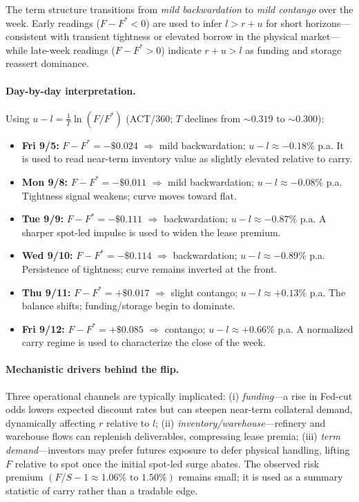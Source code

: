 \documentclass[10pt,a4paper]{article} %
\begin{document}
The term structure transitions from \emph{mild backwardation} to \emph{mild contango} over the week. Early readings (\(F-F^{*}<0\)) are used to infer \(l>r+u\) for short horizons—consistent with transient tightness or elevated borrow in the physical market—while late-week readings (\(F-F^{*}>0\)) indicate \(r+u>l\) as funding and storage reassert dominance.

\paragraph{Day-by-day interpretation.}
Using \(u-l=\frac{1}{T}\ln(F/F^{*})\) (ACT/360; \(T\) declines from \(\sim 0.319\) to \(\sim 0.300\)):
\begin{itemize}
  \item \textbf{Fri 9/5:} \(F-F^{*}=-\$0.024\) \(\Rightarrow\) mild backwardation; \(u-l\approx-0.18\%\) p.a. It is used to read near-term inventory value as slightly elevated relative to carry.
  \item \textbf{Mon 9/8:} \(F-F^{*}=-\$0.011\) \(\Rightarrow\) mild backwardation; \(u-l\approx-0.08\%\) p.a. Tightness signal weakens; curve moves toward flat.
  \item \textbf{Tue 9/9:} \(F-F^{*}=-\$0.111\) \(\Rightarrow\) backwardation; \(u-l\approx-0.87\%\) p.a. A sharper spot-led impulse is used to widen the lease premium.
  \item \textbf{Wed 9/10:} \(F-F^{*}=-\$0.114\) \(\Rightarrow\) backwardation; \(u-l\approx-0.89\%\) p.a. Persistence of tightness; curve remains inverted at the front.
  \item \textbf{Thu 9/11:} \(F-F^{*}=+\$0.017\) \(\Rightarrow\) slight contango; \(u-l\approx+0.13\%\) p.a. The balance shifts; funding/storage begin to dominate.
  \item \textbf{Fri 9/12:} \(F-F^{*}=+\$0.085\) \(\Rightarrow\) contango; \(u-l\approx+0.66\%\) p.a. A normalized carry regime is used to characterize the close of the week.
\end{itemize}

\paragraph{Mechanistic drivers behind the flip.}
Three operational channels are typically implicated: (i) \emph{funding}—a rise in Fed-cut odds lowers expected discount rates but can steepen near-term collateral demand, dynamically affecting \(r\) relative to \(l\); (ii) \emph{inventory/warehouse}—refinery and warehouse flows can replenish deliverables, compressing lease premia; (iii) \emph{term demand}—investors may prefer futures exposure to defer physical handling, lifting \(F\) relative to spot once the initial spot-led surge abates. The observed risk premium \((F/S-1\approx 1.06\% \text{ to } 1.50\%)\) remains small; it is used as a summary statistic of carry rather than a tradable edge.
\end{document}

